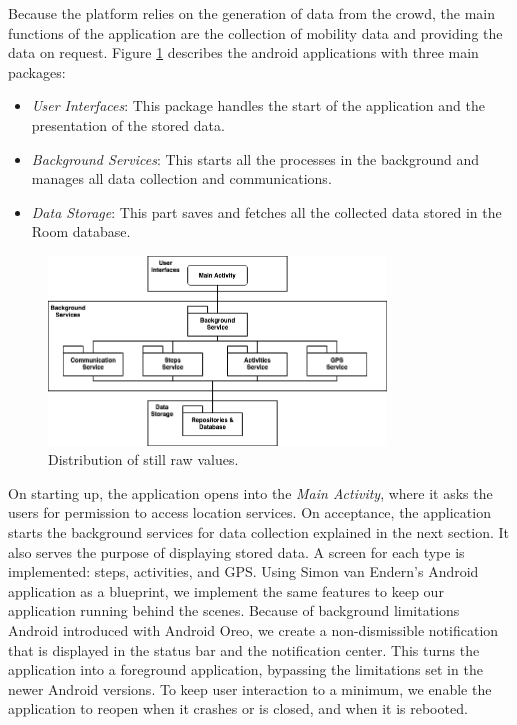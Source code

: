 Because the platform relies on the generation of data from the crowd, the main functions of the application are the collection of mobility data and providing the data on request. Figure \ref{fig:modules} describes the android applications with three main packages:

\begin{itemize}
    \item \textit{User Interfaces}: This package handles the start of the application and the presentation of the stored data.
    \item \textit{Background Services}: This starts all the processes in the background and manages all data collection and communications.
    \item \textit{Data Storage}: This part saves and fetches all the collected data stored in the Room database.
\end{itemize}

\begin{figure}[htpb]
  \centering
  \includegraphics[width=0.8\textwidth]{figures/modules}
  \caption{Distribution of still raw values.} \label{fig:modules}
\end{figure}

On starting up, the application opens into the \textit{Main Activity}, where it asks the users for permission to access location services. On acceptance, the application starts the background services for data collection explained in the next section. It also serves the purpose of displaying stored data. A screen for each type is implemented: steps, activities, and GPS. Using Simon van Endern's Android application as a blueprint, we implement the same features to keep our application running behind the scenes. Because of background limitations Android introduced with Android Oreo, we create a non-dismissible notification that is displayed in the status bar and the notification center. This turns the application into a foreground application, bypassing the limitations set in the newer Android versions. To keep user interaction to a minimum, we enable the application to reopen when it crashes or is closed, and when it is rebooted.

